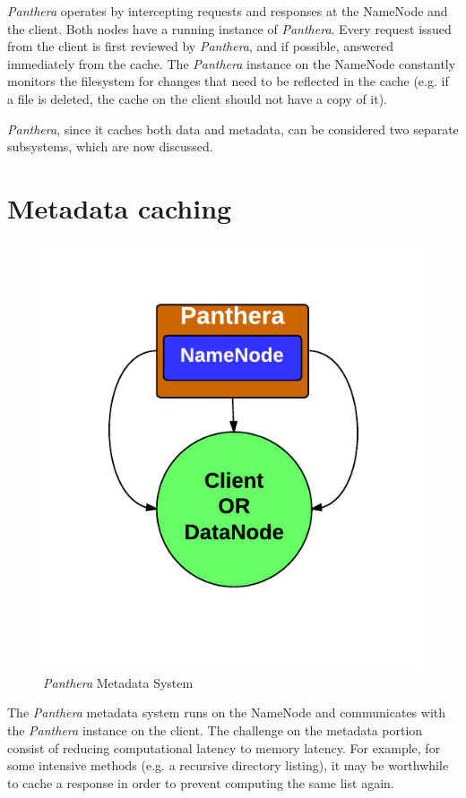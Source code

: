 \documentclass[12pt]{article}
\begin{document}
\textit{Panthera} operates by intercepting requests and responses at the NameNode and the client. Both nodes have a running instance of \textit{Panthera}. Every request issued from the client is first reviewed by \textit{Panthera}, and if possible, answered immediately from the cache. The \textit{Panthera} instance on the NameNode constantly monitors the filesystem for changes that need to be reflected in the cache (e.g. if a file is deleted, the cache on the client should not have a copy of it).

\textit{Panthera}, since it caches both data and metadata, can be considered two separate subsystems, which are now discussed.

\section{Metadata caching}

\begin{figure}[!h]
	\caption{\textit{Panthera} Metadata System}
	\centering
		\includegraphics[scale=0.4]{assets/panthera_meta_architecture.pdf}
\end{figure}

The \textit{Panthera} metadata system runs on the NameNode and communicates with the \textit{Panthera} instance on the client. The challenge on the metadata portion consist of reducing computational latency to memory latency. For example, for some intensive methods (e.g. a recursive directory listing), it may be worthwhile to cache a response in order to prevent computing the same list again.
\end{document}

